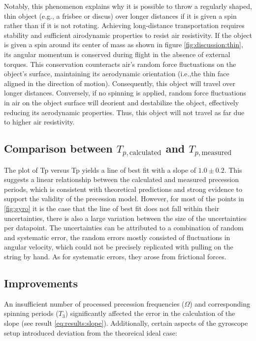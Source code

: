 \begin{multicols}{2}
Notably, this phenomenon explains why it is possible to throw a regularly shaped, thin object (e.g., a frisbee or discus) over longer distances if it is given a spin rather than if it is not rotating. Achieving long-distance transportation requires stability and sufficient airodynamic properties to resist air resistivity. If the object is given a spin around its center of mass as shown in figure \ref{fig:discussion:thin}, its angular momentum is conserved during flight in the absence of external torques. This conservation counteracts air's random force fluctuations on the object's surface, maintaining its aerodynamic orientation (i.e.,the thin face aligned in the direction of motion). Consequently, this object will travel over longer distances. Conversely, if no spinning is applied, random force fluctuations in air on the object surface will deorient and destabilize the object, effectively reducing its aerodynamic properties. Thus, this object will not travel as far due to higher air resistivity. 

\subsection{Comparison between $T_{p, \text{calculated}}$ and $T_{p, \text{measured}}$}

The plot of Tp versus Tp yields a line of best fit with a slope of $1.0 \pm 0.2$. This suggests a linear relationship between the calculated and measured precession periods, which is consistent with theoretical predictions and strong evidence to support the validity of the precession model.
However, for most of the points in \ref{fig:gyro} it is the case that the line of best fit does not fall within their uncertainties, there is also a large variation between the size of the uncertainties per datapoint. The uncertainties can be attributed to a combination of random and systematic error, the random errors mostly consisted of fluctuations in angular velocity, which could not be precisely replicated with pulling on the string by hand. As for systematic errors, they arose from frictional forces.

\subsection{Improvements} \label{sec:discussion:improvements}

An insufficient number of processed precession frequencies ($\Omega$) and corresponding spinning periods ($T_{3}$) significantly affected the error in the calculation of the slope (see result \ref{eq:results:slope}). Additionally, certain aspects of the gyroscope setup introduced deviation from the theoreical ideal case:


\end{multicols}
